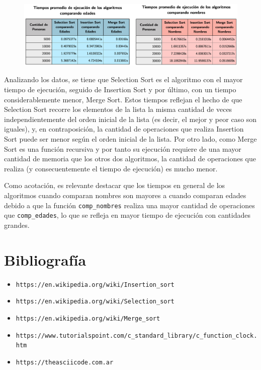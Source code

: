 \documentclass[11pt]{article}
\begin{document}
\begin{figure}[h]
    \begin{center}
        \includegraphics[scale = 0.5]{TABLAS}\par
    \end{center}
\end{figure}

Analizando los datos, se tiene que Selection Sort es el algoritmo con el mayor tiempo de ejecución, seguido de Insertion Sort y por último, con un tiempo considerablemente menor, Merge Sort. Estos tiempos reflejan el hecho de que Selection Sort recorre los elementos de la lista la misma cantidad de veces independientemente del orden inicial de la lista (es decir, el mejor y peor caso son iguales), y, en contraposición, la cantidad de operaciones que realiza Insertion Sort puede ser menor según el orden inicial de la lista. Por otro lado, como Merge Sort es una función recursiva y por tanto su ejecución requiere de una mayor cantidad de memoria que los otros dos algoritmos, la cantidad de operaciones que realiza (y consecuentemente el tiempo de ejecución) es mucho menor.\par

Como acotación, es relevante destacar que los tiempos en general de los algoritmos cuando comparan nombres son mayores a cuando comparan edades debido a que la función \verb|comp_nombres| realiza una mayor cantidad de operaciones que \verb|comp_edades|, lo que se refleja en mayor tiempo de ejecución con cantidades grandes.\par



\section{Bibliografía}
\begin{itemize}
    \item \verb|https://en.wikipedia.org/wiki/Insertion_sort|
    \item \verb|https://en.wikipedia.org/wiki/Selection_sort|
    \item \verb|https://en.wikipedia.org/wiki/Merge_sort|
    \item \verb|https://www.tutorialspoint.com/c_standard_library/c_function_clock.htm|
    \item \verb|https://theasciicode.com.ar|
\end{itemize}
\end{document}
